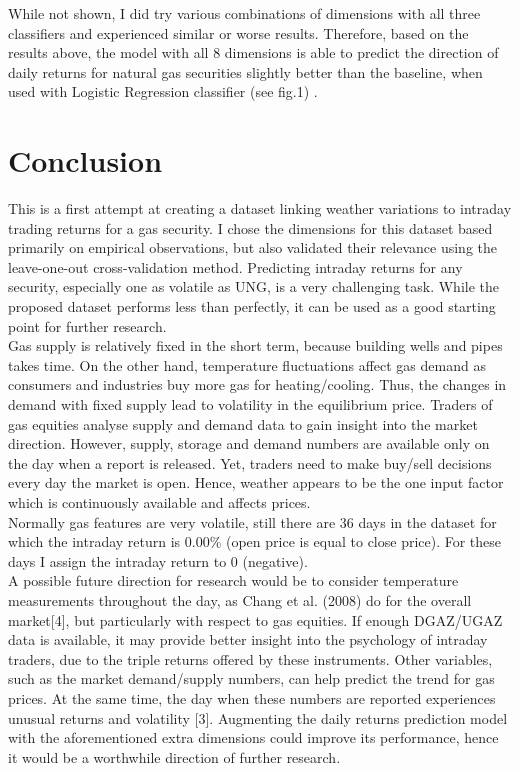 \documentclass[conference,letterpaper]{IEEEtran}
\begin{document}
While not shown, I did try various combinations of dimensions with all three classifiers and experienced similar or worse results. Therefore,
based on the results above, the model with all 8 dimensions is able to predict the direction of daily returns for natural gas securities slightly
better than the baseline, when used with Logistic Regression classifier (see fig.1) . \\

\section{Conclusion}
This is a first attempt at creating a dataset linking weather variations to intraday trading returns for a gas security. I chose the dimensions for this
dataset based primarily on empirical observations, but also validated their relevance using the leave-one-out cross-validation method. Predicting intraday
returns for any security, especially one as volatile as UNG, is a very challenging task. While the proposed dataset performs less than perfectly, it can be
used as a good starting point for further research. \\
\indent Gas supply is relatively fixed in the short term, because building wells and pipes takes time. On the other hand,
temperature fluctuations affect gas demand as consumers and industries buy more gas for heating/cooling. Thus, the changes in demand with fixed
supply lead to volatility in the equilibrium price. Traders of gas equities analyse supply and demand data to gain insight into the market direction. However,
supply, storage and demand numbers are available only on the day when a report is released. Yet, traders need to make buy/sell decisions every day the market
is open. Hence, weather appears to be the one input factor which is continuously available and affects prices. \\
Normally gas features are very volatile, still there are 36 days in the dataset
for which the intraday return is 0.00\% (open price is equal to close price). For these
days I assign the intraday return to 0 (negative).\\
\indent A possible future direction for research would be to consider temperature measurements throughout the day, as Chang et al. (2008) do for the overall market[4], but
particularly with respect to gas equities. If enough DGAZ/UGAZ data is available, it may provide better insight into the psychology of intraday traders, due to the triple
returns offered by these instruments. Other variables, such as the market demand/supply numbers, can help predict the trend for gas prices. At the same time, the
day when these numbers are reported experiences unusual returns and volatility [3]. Augmenting the daily returns prediction model with the aforementioned extra
dimensions could improve its performance, hence it would be a worthwhile direction of further research. \\
\end{document}

